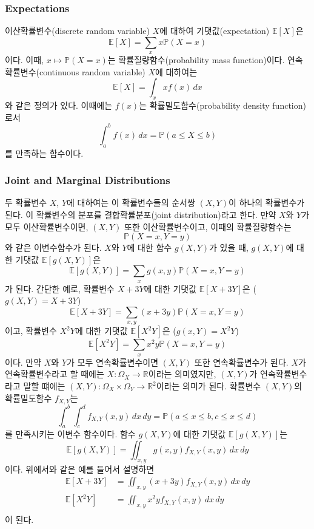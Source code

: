 \documentclass{article}
\begin{document}
\subsubsection{Expectations}
이산확률변수(discrete random variable) \(X\)에 대하여 기댓값(expectation) \(\mathbb E[X]\)은
\[\mathbb E[X]=\sum_xx\mathbb P(X=x)\]
이다.
이때, \(x\mapsto\mathbb P(X=x)\)는 확률질량함수(probability mass function)이다.
연속확률변수(continuous random variable) \(X\)에 대하여는
\[\mathbb E[X]=\int_xxf(x)\,dx\]
와 같은 정의가 있다.
이때에는 \(f(x)\)는 확률밀도함수(probability density function)로서
\[\int_a^bf(x)\,dx=\mathbb P(a\le X\le b)\]를 만족하는 함수이다.

%
\subsubsection{Joint and Marginal Distributions}
두 확률변수 \(X\), \(Y\)에 대하여는 이 확률변수들의 순서쌍 \((X,Y)\)이 하나의 확률변수가 된다.
이 확률변수의 분포를 결합확률분포(joint distribution)라고 한다.
만약 \(X\)와 \(Y\)가 모두 이산확률변수이면, \((X,Y)\) 또한 이산확률변수이고, 이때의 확률질량함수는
\[\mathbb P(X=x, Y=y)\]
와 같은 이변수함수가 된다.
\(X\)와 \(Y\)에 대한 함수 \(g(X,Y)\)가 있을 때, \(g(X,Y)\)에 대한 기댓값 \(\mathbb E[g(X,Y)]\)은
\[\mathbb E[g(X,Y)]=\sum_xg(x,y)\mathbb P(X=x,Y=y)\]
가 된다.
간단한 예로, 확률변수 \(X+3Y\)에 대한 기댓값 \(\mathbb E[X+3Y]\)은 (\(g(X,Y)=X+3Y\))
\[\mathbb E[X+3Y]=\sum_{x,y}(x+3y)\mathbb P(X=x,Y=y)\]
이고, 확률변수 \(X^2Y\)에 대한 기댓값 \(\mathbb E[X^2Y]\)은 (\(g(x,Y)=X^2Y\))
\[\mathbb E[X^2Y]=\sum_xx^2y\mathbb P(X=x,Y=y)\]
이다.
만약 \(X\)와 \(Y\)가 모두 연속확률변수이면 \((X,Y)\) 또한 연속확률변수가 된다.
\(X\)가 연속확률변수라고 할 때에는 \(X:\Omega_X\to\mathbb R\)이라는 의미였지만, \((X,Y)\)가 연속확률변수라고 말할 떄에는 \((X,Y):\Omega_X\times\Omega_Y\to\mathbb R^2\)이라는 의미가 된다.
확률변수 \((X,Y)\)의 확률밀도함수 \(f_{X,Y}\)는
\[\int_a^b\int_c^df_{X,Y}(x,y)\,dx\,dy=\mathbb P(a\le x\le b,c\le x\le d)\]
를 만족시키는 이변수 함수이다.
함수 \(g(X,Y)\)에 대한 기댓값 \(\mathbb E[g(X,Y)]\)는
\[\mathbb E[g(X,Y)]=\iint_{x,y}g(x,y)f_{X,Y}(x,y)\,dx\,dy\]
이다.
위에서와 같은 예를 들어서 설명하면
\begin{align*}
\mathbb E[X+3Y]&=\iint_{x,y}(x+3y)f_{X,Y}(x,y)\,dx\,dy\\
\mathbb E[X^2Y]&=\iint_{x,y}x^2yf_{X,Y}(x,y)\,dx\,dy\\
\end{align*}
이 된다.
\end{document}
